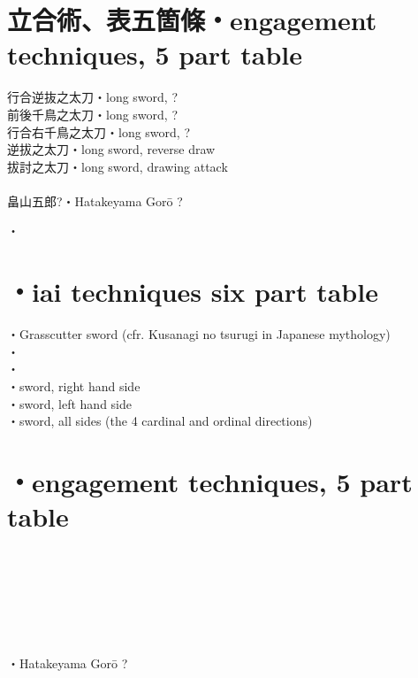 \documentclass[dvipdfmx, a4paper, 12pt]{utarticle}
\begin{document}
\begin{CJK*}{UTF8}{min}
\begin{landscape}
\section{立合術、表五箇條・engagement techniques, 5 part table}
\noindent 行合逆抜之太刀・long sword, ?\\
前後千鳥之太刀・long sword, ?\\
行合右千鳥之太刀・long sword, ?\\
逆拔之太刀・long sword, reverse draw\\
拔討之太刀・long sword, drawing attack\\
\\
畠山五郎?・Hatakeyama Gor\={o} ?


\setcounter{section}{0}
\newpage
\pagestyle{empty}
・\\
\section{・iai techniques six part table}
\noindent {}・Grasscutter sword (cfr. Kusanagi no tsurugi in Japanese mythology)\\
・\\
・\\
・sword, right hand side\\
・sword, left hand side\\
・sword, all sides (the 4 cardinal and ordinal directions)\\
\section{・engagement techniques, 5 part table}
\noindent {}\\
\\
\\
\\
\\
\\
・Hatakeyama Gor\={o} ?\\


\end{landscape}
\end{CJK*}
\end{document}
